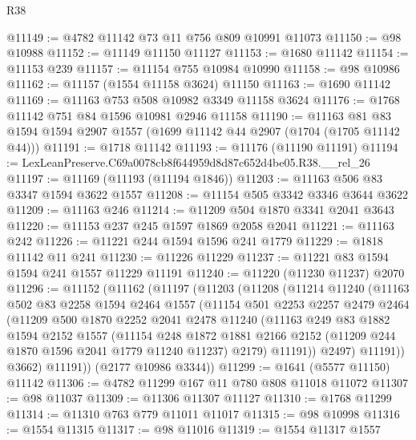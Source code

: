 \begin{lexlean}{R38}
\begin{coremodule}
@11149 := @4782 @11142 @73 @11 @756 @809 @10991 @11073
@11150 := @98 @10988
@11152 := @11149 @11150 @11127
@11153 := @1680 @11142
@11154 := @11153 @239
@11157 := @11154 @755 @10984 @10990
@11158 := @98 @10986
@11162 := @11157 (@1554 @11158 @3624) @11150
@11163 := @1690 @11142
@11169 := @11163 @753 @508 @10982 @3349 @11158 @3624
@11176 := @1768 @11142 @751 @84 @1596 @10981 @2946 @11158
@11190 := @11163 @81 @83 @1594 @1594 @2907 @1557 (@1699 @11142 @44 @2907 (@1704 (@1705 @11142 @44)))
@11191 := @1718 @11142
@11193 := @11176 (@11190 @11191)
@11194 := LexLeanPreserve.C69a0078cb8f644959d8d87c652d4be05.R38.__rel_26
@11197 := @11169 (@11193 (@11194 @1846))
@11203 := @11163 @506 @83 @3347 @1594 @3622 @1557
@11208 := @11154 @505 @3342 @3346 @3644 @3622
@11209 := @11163 @246
@11214 := @11209 @504 @1870 @3341 @2041 @3643
@11220 := @11153 @237 @245 @1597 @1869 @2058 @2041
@11221 := @11163 @242
@11226 := @11221 @244 @1594 @1596 @241 @1779
@11229 := @1818 @11142 @11 @241
@11230 := @11226 @11229
@11237 := @11221 @83 @1594 @1594 @241 @1557 @11229 @11191
@11240 := @11220 (@11230 @11237) @2070
@11296 := @11152
    (@11162
      (@11197
        (@11203
          (@11208
            (@11214
              @11240
              (@11163
                @502
                @83
                @2258
                @1594
                @2464
                @1557
                (@11154
                  @501
                  @2253
                  @2257
                  @2479
                  @2464
                  (@11209
                    @500
                    @1870
                    @2252
                    @2041
                    @2478
                    @11240
                    (@11163
                      @249
                      @83
                      @1882
                      @1594
                      @2152
                      @1557
                      (@11154
                        @248
                        @1872
                        @1881
                        @2166
                        @2152
                        (@11209 @244 @1870 @1596 @2041 @1779 @11240 @11237)
                        @2179)
                      @11191))
                  @2497)
                @11191))
            @3662)
          @11191))
      (@2177 @10986 @3344))
@11299 := @1641 (@5577 @11150) @11142
@11306 := @4782 @11299 @167 @11 @780 @808 @11018 @11072
@11307 := @98 @11037
@11309 := @11306 @11307 @11127
@11310 := @1768 @11299
@11314 := @11310 @763 @779 @11011 @11017
@11315 := @98 @10998
@11316 := @1554 @11315
@11317 := @98 @11016
@11319 := @1554 @11317 @1557

\end{coremodule}
\end{lexlean}
